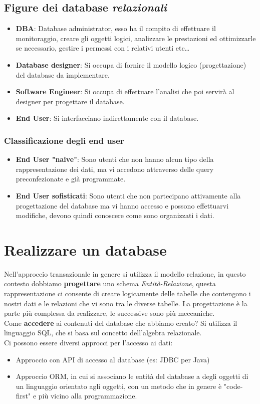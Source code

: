 \documentclass[a4paper,12pt]{report}
\begin{document}
\subsection{Figure dei database \textit{relazionali}}
\begin{itemize}
	\item \textbf{DBA}: Database administrator, esso ha il compito di effettuare il monitoraggio, creare gli oggetti logici, analizzare le prestazioni ed ottimizzarle se necessario, gestire i permessi con i relativi utenti etc\dots
	\item \textbf{Database designer}: Si occupa di fornire il modello logico (progettazione) del database da implementare.
	\item \textbf{Software Engineer}: Si occupa di effettuare l'analisi che poi servirà al designer per progettare il database.
	\item \textbf{End User}: Si interfacciano indirettamente con il database.
\end{itemize}
\subsubsection{Classificazione degli end user}
\begin{itemize}
	\item \textbf{End User "naive"}: Sono utenti che non hanno alcun tipo della rappresentazione dei dati, ma vi accedono attraverso delle query preconfezionate e già programmate.
	\item \textbf{End User sofisticati}: Sono utenti che non partecipano attivamente alla progettazione del database ma vi hanno accesso e possono effettuarvi modifiche, devono quindi conoscere come sono organizzati i dati.
\end{itemize}
\section{Realizzare un database}
Nell'approccio transazionale in genere si utilizza il modello relazione, in questo contesto dobbiamo \textbf{progettare} uno schema \textit{Entità-Relazione}, questa rappresentazione ci consente di creare logicamente delle tabelle che contengono i nostri dati e le relazioni che vi sono tra le diverse tabelle. La progettazione è la parte più complessa da realizzare, le successive sono più meccaniche.\\
Come \textbf{accedere} ai contenuti del database che abbiamo creato? Si utilizza il linguaggio SQL, che si basa sul concetto dell'algebra relazionale.\\
Ci possono essere diversi approcci per l'accesso ai dati:
\begin{itemize}
	\item Approccio con API di accesso al database (es: JDBC per Java)
	\item Approccio ORM, in cui si associano le entità del database a degli oggetti di un linguaggio orientato agli oggetti, con un metodo che in genere è "code-first" e più vicino alla programmazione.
\end{itemize}
\end{document}
